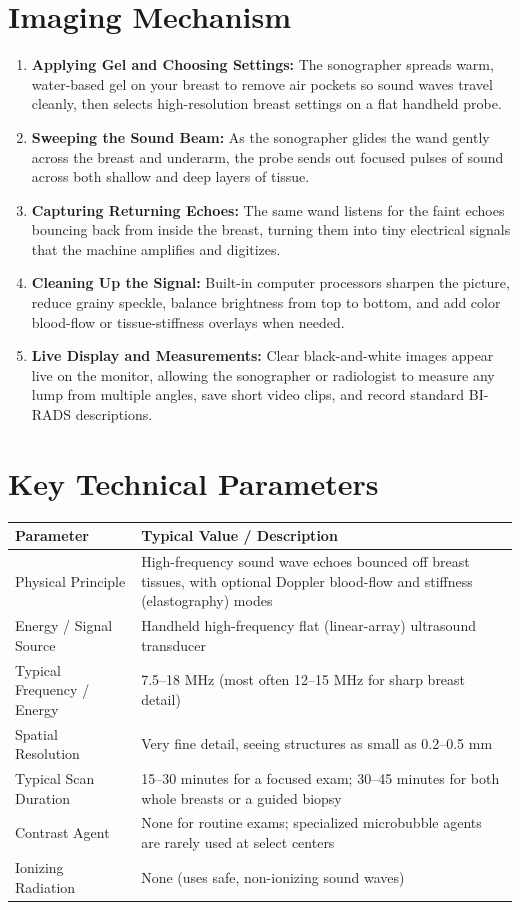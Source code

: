 \section{Imaging Mechanism}
\begin{enumerate}
\item \textbf{Applying Gel and Choosing Settings:} The sonographer spreads warm, water-based gel on your breast to remove air pockets so sound waves travel cleanly, then selects high-resolution breast settings on a flat handheld probe.
\item \textbf{Sweeping the Sound Beam:} As the sonographer glides the wand gently across the breast and underarm, the probe sends out focused pulses of sound across both shallow and deep layers of tissue.
\item \textbf{Capturing Returning Echoes:} The same wand listens for the faint echoes bouncing back from inside the breast, turning them into tiny electrical signals that the machine amplifies and digitizes.
\item \textbf{Cleaning Up the Signal:} Built-in computer processors sharpen the picture, reduce grainy speckle, balance brightness from top to bottom, and add color blood-flow or tissue-stiffness overlays when needed.
\item \textbf{Live Display and Measurements:} Clear black-and-white images appear live on the monitor, allowing the sonographer or radiologist to measure any lump from multiple angles, save short video clips, and record standard BI-RADS descriptions.
\end{enumerate}

\section{Key Technical Parameters}
\noindent
\begin{tabularx}{\textwidth}{@{}l X@{}}
\toprule
\textbf{Parameter} & \textbf{Typical Value / Description} \\
\midrule
Physical Principle & High-frequency sound wave echoes bounced off breast tissues, with optional Doppler blood-flow and stiffness (elastography) modes \\
Energy / Signal Source & Handheld high-frequency flat (linear-array) ultrasound transducer \\
Typical Frequency / Energy & 7.5--18 MHz (most often 12--15 MHz for sharp breast detail) \\
Spatial Resolution & Very fine detail, seeing structures as small as 0.2--0.5 mm \\
Typical Scan Duration & 15--30 minutes for a focused exam; 30--45 minutes for both whole breasts or a guided biopsy \\
Contrast Agent & None for routine exams; specialized microbubble agents are rarely used at select centers \\
Ionizing Radiation & None (uses safe, non-ionizing sound waves) \\
\bottomrule
\end{tabularx}

